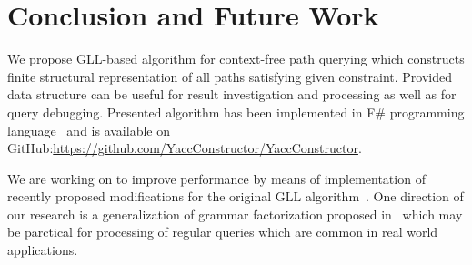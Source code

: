 \section{Conclusion and Future Work}

We propose GLL-based algorithm for context-free path querying which constructs finite structural representation of all paths satisfying given constraint.
Provided data structure can be useful for result investigation and processing as well as for query debugging.
Presented algorithm has been implemented in F\# programming language~\cite{FSharp} and is available on GitHub:\url{https://github.com/YaccConstructor/YaccConstructor}.

We are working on to improve performance by means of implementation of recently proposed modifications for the original GLL algorithm~\cite{FGLL,FastPracticalGLL}.
One direction of our research is a generalization of grammar factorization proposed in~\cite{FGLL} which may be parctical for processing of regular queries which are common in real world applications.
